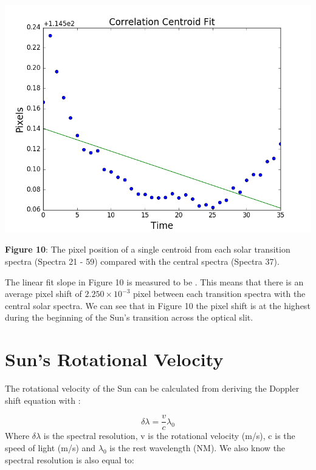 \documentclass[onecolumn, 12pt, a4paper]{article}
\begin{document}
\centerline{\includegraphics[scale =0.45]{figure_1-10.png}}\newline

\textbf{Figure 10}: The pixel position of a single centroid from each solar transition spectra (Spectra 21 - 59) compared with the central spectra (Spectra 37). \newline

The linear fit slope in Figure 10 is measured to be . This means that there is an average pixel shift of $2.250 \times 10^{-3}$ pixel between each transition spectra with the central solar spectra. We can see that in Figure 10 the pixel shift is at the highest during the beginning of the Sun's transition across the optical slit.
 
\section{Sun's Rotational Velocity}

The rotational velocity of the Sun can be calculated from deriving the Doppler shift equation with :

\begin{equation}\label{eq:2}
\delta \lambda = \dfrac{v}{c} \lambda_0
\end{equation}
Where $\delta \lambda$ is the spectral resolution, v is the rotational velocity (m/s), c is the speed of light (m/s) and $\lambda_0$ is the rest wavelength (NM). We also know the spectral resolution is also equal to:
\end{document}
